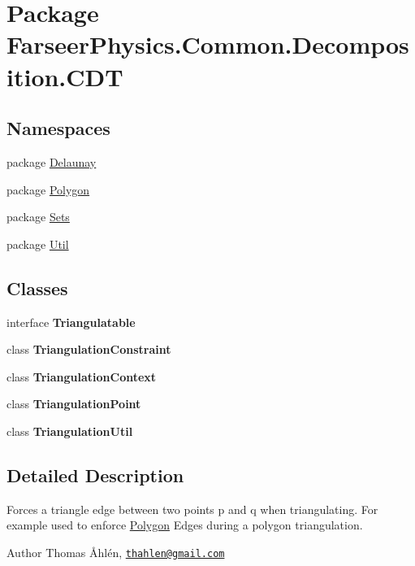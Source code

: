 \hypertarget{namespace_farseer_physics_1_1_common_1_1_decomposition_1_1_c_d_t}{\section{Package Farseer\+Physics.\+Common.\+Decomposition.\+C\+D\+T}
\label{namespace_farseer_physics_1_1_common_1_1_decomposition_1_1_c_d_t}
}
\subsection*{Namespaces}
\begin{DoxyCompactItemize}
\item 
package \hyperlink{namespace_farseer_physics_1_1_common_1_1_decomposition_1_1_c_d_t_1_1_delaunay}{Delaunay}
\item 
package \hyperlink{namespace_farseer_physics_1_1_common_1_1_decomposition_1_1_c_d_t_1_1_polygon}{Polygon}
\item 
package \hyperlink{namespace_farseer_physics_1_1_common_1_1_decomposition_1_1_c_d_t_1_1_sets}{Sets}
\item 
package \hyperlink{namespace_farseer_physics_1_1_common_1_1_decomposition_1_1_c_d_t_1_1_util}{Util}
\end{DoxyCompactItemize}
\subsection*{Classes}
\begin{DoxyCompactItemize}
\item 
interface {\bfseries Triangulatable}
\item 
class {\bfseries Triangulation\+Constraint}
\item 
class {\bfseries Triangulation\+Context}
\item 
class {\bfseries Triangulation\+Point}
\item 
class {\bfseries Triangulation\+Util}
\end{DoxyCompactItemize}


\subsection{Detailed Description}
Forces a triangle edge between two points p and q when triangulating. For example used to enforce \hyperlink{namespace_farseer_physics_1_1_common_1_1_decomposition_1_1_c_d_t_1_1_polygon}{Polygon} Edges during a polygon triangulation.

\begin{DoxyAuthor}{Author}
Thomas Åhlén, \href{mailto:thahlen@gmail.com}{\tt thahlen@gmail.\+com} 
\end{DoxyAuthor}
